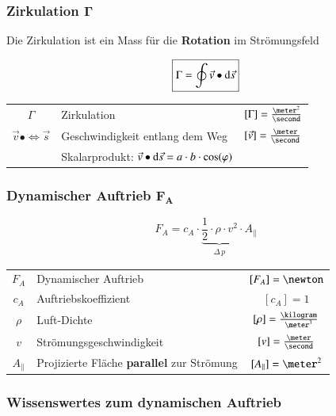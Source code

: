 \subsubsection{Zirkulation $\bm{\Gamma}$}

Die Zirkulation ist ein Mass für die \textbf{Rotation} im Strömungsfeld

$$ \boxed{ \Gamma = \oint \vec{v} \bullet \mathop{} \! \mathrm{d} \vec{s} } $$

\renewcommand{\arraystretch}{1.5}
\begin{tabular}{c l c}
	$\Gamma$                        & Zirkulation                       & $[\Gamma] = \frac{\meter^2}{\second}$     \\
	$\vec{v} \bullet \iff \vec{s}$  & Geschwindigkeit entlang dem Weg   & $[\vec{v}] = \frac{\meter}{\second}$      \\
	& Skalarprodukt: $\vec{v} \bullet  \mathop{} \! \mathrm{d} \vec{s} = a \cdot b \cdot \cos(\varphi)$
\end{tabular}
\renewcommand{\arraystretch}{1}


\subsubsection[Dynamischer Auftrieb]{Dynamischer Auftrieb $\bm{F_A}$}

\vspace{-0.2cm}

$$ \boxed{ F_A = c_A \cdot \underbrace{\frac{1}{2} \cdot \rho \cdot v^2 }_{\substack{\Delta \, p}} \cdot A_{\|}	} $$

\renewcommand{\arraystretch}{1.3}
\begin{tabular}{c l c}
	$F_A$       & Dynamischer Auftrieb                              & $[F_A] = \newton$                     \\
	$c_A$       & Auftriebskoeffizient                              & $[c_A] = 1$                           \\
	$\rho$      & Luft-Dichte                                       & $[\rho] = \frac{\kilogram}{\meter^3}$ \\
	$v$         & Strömungsgeschwindigkeit                          & $[v] = \frac{\meter}{\second}$        \\
	$A_{\|}$    & Projizierte Fläche \textbf{parallel} zur Strömung & $[A_{\|}] = \meter^2$
\end{tabular}
\renewcommand{\arraystretch}{1}


\subsubsection{Wissenswertes zum dynamischen Auftrieb}

